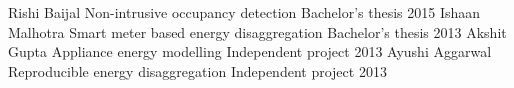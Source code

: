 
\begin{cvhonors}
  \cvhonor
    {Rishi Baijal}
    {Non-intrusive occupancy detection}
    {Bachelor's thesis}
    {2015}
  \cvhonor
   {Ishaan Malhotra}
   {Smart meter based energy disaggregation}
   {Bachelor's thesis}
   {2013}
     \cvhonor
     {Akshit Gupta}
     {Appliance energy modelling}
     {Independent project}
     {2013}
      \cvhonor
      {Ayushi Aggarwal}
      {Reproducible energy disaggregation}
      {Independent project}
      {2013}
 \end{cvhonors}

